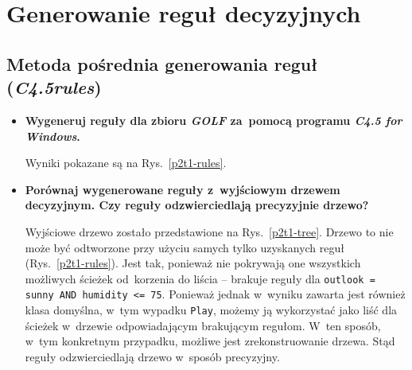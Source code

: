
\section{Generowanie reguł decyzyjnych}

\subsection{Metoda pośrednia generowania reguł (\emph{C4.5rules})}
\begin{itemize}
\item \textbf{Wygeneruj reguły dla zbioru \emph{GOLF} za~pomocą programu \emph{C4.5 for Windows}.}


Wyniki pokazane są na Rys.~\ref{p2t1-rules}.

\item \textbf{Porównaj wygenerowane reguły z~wyjściowym drzewem decyzyjnym. Czy reguły odzwierciedlają precyzyjnie drzewo?}


Wyjściowe drzewo zostało przedstawione na Rys.~\ref{p2t1-tree}. Drzewo to nie może być odtworzone przy użyciu samych tylko uzyskanych reguł (Rys.~\ref{p2t1-rules}). Jest tak, ponieważ nie pokrywają one wszystkich możliwych ścieżek od~korzenia do liścia -- brakuje reguły dla \texttt{outlook = sunny AND humidity <= 75}. Ponieważ jednak w~wyniku zawarta jest również klasa domyślna, w~tym wypadku \texttt{Play}, możemy ją wykorzystać jako liść dla ścieżek w~drzewie odpowiadającym brakującym regułom. W~ten sposób, w~tym konkretnym przypadku, możliwe jest zrekonstruowanie drzewa. Stąd reguły odzwierciedlają drzewo w~sposób precyzyjny.
\end{itemize}

